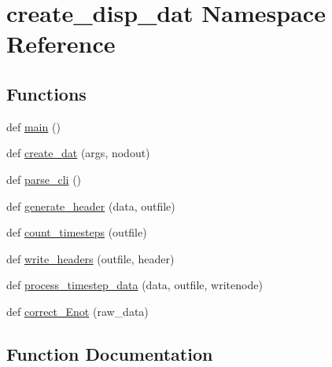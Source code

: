 \hypertarget{namespacecreate__disp__dat}{}\section{create\+\_\+disp\+\_\+dat Namespace Reference}
\label{namespacecreate__disp__dat}
\subsection*{Functions}
\begin{DoxyCompactItemize}
\item 
def \hyperlink{namespacecreate__disp__dat_a2c72342c74cbfc6aa1c7255667cab733}{main} ()
\item 
def \hyperlink{namespacecreate__disp__dat_a1743ae8328206c7acf6f8327d220e2b6}{create\+\_\+dat} (args, nodout)
\item 
def \hyperlink{namespacecreate__disp__dat_a31d57fa6b21cc4cf6fbd8e889fe72f06}{parse\+\_\+cli} ()
\item 
def \hyperlink{namespacecreate__disp__dat_af1643fd489a6e157aa356eaed757e672}{generate\+\_\+header} (data, outfile)
\item 
def \hyperlink{namespacecreate__disp__dat_ab8ddf71ee7868434c755372fcc69db4e}{count\+\_\+timesteps} (outfile)
\item 
def \hyperlink{namespacecreate__disp__dat_a129a015c6fcfd08ec6dd70035a225c5a}{write\+\_\+headers} (outfile, header)
\item 
def \hyperlink{namespacecreate__disp__dat_a07542eb98be42a9312bc0202a242c8f6}{process\+\_\+timestep\+\_\+data} (data, outfile, writenode)
\item 
def \hyperlink{namespacecreate__disp__dat_a4c15e65b7f66705ca17776294e96a446}{correct\+\_\+\+Enot} (raw\+\_\+data)
\end{DoxyCompactItemize}


\subsection{Function Documentation}
\hypertarget{namespacecreate__disp__dat_a4c15e65b7f66705ca17776294e96a446}{}
